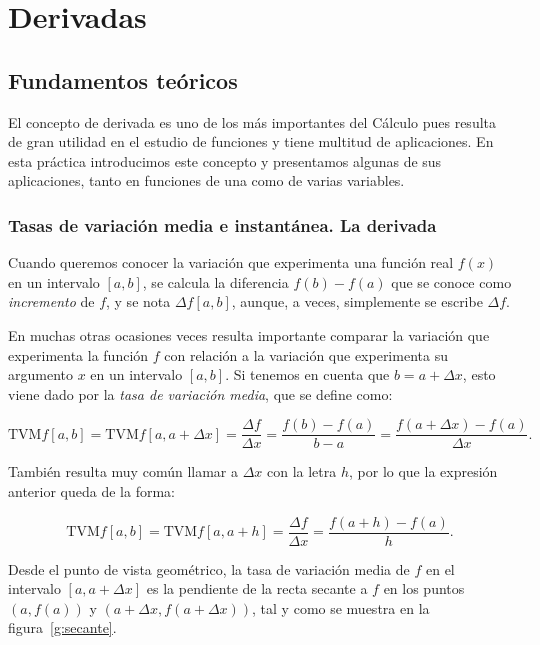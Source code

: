 
\chapter{Derivadas}

\section{Fundamentos teóricos}
El concepto de derivada es uno de los más importantes del Cálculo
pues resulta de gran utilidad en el estudio de funciones y tiene
multitud de aplicaciones. En esta práctica introducimos este
concepto y presentamos algunas de sus aplicaciones, tanto en
funciones de una como de varias variables.

\subsection{Tasas de variación media e instantánea. La derivada}
Cuando queremos conocer la variación que experimenta una función
real $f(x)$ en un intervalo $[a,b]$, se calcula la diferencia
$f(b)-f(a)$ que se conoce como \emph{incremento} de $f$, y se nota
$\Delta f[a,b]$, aunque, a veces, simplemente se escribe $\Delta f$.

En muchas otras ocasiones veces resulta importante comparar la
variación que experimenta la función $f$ con relación a la variación
que experimenta su argumento $x$ en un intervalo $[a,b]$. Si tenemos
en cuenta que $b=a+\Delta x$, esto viene dado por la \emph{tasa de
variación media}, que se define como:

\[
\textrm{TVM} f[a,b]=\textrm{TVM} f[a,a+\Delta x]=\frac{\Delta
f}{\Delta x}=\frac{f(b)-f(a)}{b-a}=\frac{f(a+\Delta x )-f(a)}{\Delta
x}.
\]

También resulta muy común llamar a $\Delta x$ con la letra $h$, por
lo que la expresión anterior queda de la forma:

\[
\textrm{TVM} f[a,b]=\textrm{TVM} f[a,a+h]=\frac{\Delta f}{\Delta
x}=\frac{f(a+h)-f(a)}{h}.
\]

Desde el punto de vista geométrico, la tasa de variación media de
$f$ en el intervalo $[a , a+\Delta x]$ es la pendiente de la recta
secante a $f$ en los puntos $(a , f(a))$ y $(a+\Delta x, f(a+\Delta
x))$, tal y como se muestra en la figura~\ref{g:secante}.

